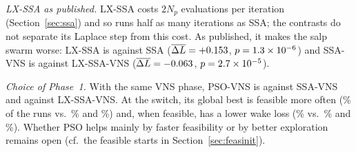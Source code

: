 \emph{LX-SSA as published.} LX-SSA costs $2N_p$ evaluations per iteration (Section~\ref{sec:ssa}) and so runs half as many iterations as SSA; the contrasts do not separate its Laplace step from this cost. As published, it makes the salp swarm worse: LX-SSA is \NAblLXSSAvsSSA{} against SSA ($\overline{\Delta L}=+0.153$, $p=1.3\times10^{-6}$) and SSA-VNS is \NAblSSAVNSvsLXSSAVNS{} against LX-SSA-VNS ($\overline{\Delta L}=-0.063$, $p=2.7\times10^{-5}$).

\emph{Choice of Phase~1.} With the same VNS phase, PSO-VNS is \NAblPSOVNSvsSSAVNS{} against SSA-VNS and \NAblPSOVNSvsLXSSAVNS{} against LX-SSA-VNS. At the switch, its global best is feasible more often (\NSwitchFeasPSOVNS\% of the runs vs.\ \NSwitchFeasSSAVNS\% and \NSwitchFeasLXSSAVNS\%) and, when feasible, has a lower wake loss (\NSwitchLossPSOVNS\% vs.\ \NSwitchLossSSAVNS\% and \NSwitchLossLXSSAVNS\%). Whether PSO helps mainly by faster feasibility or by better exploration remains open (cf.\ the feasible starts in Section~\ref{sec:feasinit}).


